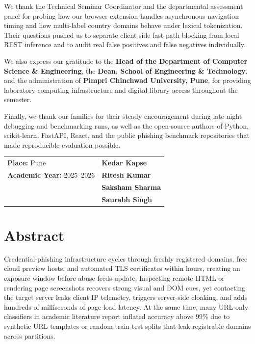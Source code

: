 \documentclass[12pt,a4paper]{report}
\newcommand{\AcademicYear}{2025--2026}
\begin{document}
We thank the Technical Seminar Coordinator and the departmental assessment panel for probing how our browser extension handles asynchronous navigation timing and how multi-label country domains behave under lexical tokenization. Their questions pushed us to separate client-side fast-path blocking from local REST inference and to audit real false positives and false negatives individually.

We also express our gratitude to the \textbf{Head of the Department of Computer Science \& Engineering}, the \textbf{Dean, School of Engineering \& Technology}, and the administration of \textbf{Pimpri Chinchwad University, Pune}, for providing laboratory computing infrastructure and digital library access throughout the semester.

Finally, we thank our families for their steady encouragement during late-night debugging and benchmarking runs, as well as the open-source authors of Python, scikit-learn, FastAPI, React, and the public phishing benchmark repositories that made reproducible evaluation possible.

\vfill
\noindent
\begin{tabular}{@{}p{}p{}@{}}
\textbf{Place:} Pune & \raggedleft \textbf{Kedar Kapse}\tabularnewline
\textbf{Academic Year:} \AcademicYear & \raggedleft \textbf{Ritesh Kumar}\tabularnewline
 & \raggedleft \textbf{Saksham Sharma}\tabularnewline
 & \raggedleft \textbf{Saurabh Singh}\tabularnewline
\end{tabular}
\clearpage

\chapter*{Abstract}
{}
\vspace*{-8pt}

Credential-phishing infrastructure cycles through freshly registered domains, free cloud preview hosts, and automated TLS certificates within hours, creating an exposure window before abuse feeds update. Inspecting remote HTML or rendering page screenshots recovers strong visual and DOM cues, yet contacting the target server leaks client IP telemetry, triggers server-side cloaking, and adds hundreds of milliseconds of page-load latency. At the same time, many URL-only classifiers in academic literature report inflated accuracy above $99\%$ due to synthetic URL templates or random train-test splits that leak registrable domains across partitions.
\end{document}
